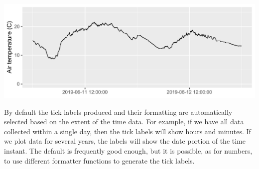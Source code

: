 \documentclass[krantz2]{krantz}\usepackage{knitr}
\begin{document}
\begin{knitrout}\footnotesize
{}\color{fgcolor}\begin{kframe}
\begin{alltt}
\hlstd{(} 
       \hlstd{(}  \hlstd{=}  \hlopt{+}
  \hlstd{()} \hlopt{+}
  \hlstd{(} \hlstd{=} \hlstd{,}
                    \hlstd{=} \hlstd{(}\hlstd{,}  \hlstd{=} \hlstd{)} \hlopt{+} \hlstd{(}\hlopt{:}\hlstd{),}
                    \hlstd{=} \hlstd{(}\hlstd{,}  \hlstd{=} \hlstd{)} \hlopt{+} \hlstd{(}\hlstd{(}\hlstd{,} \hlstd{)))} \hlopt{+}
  \hlstd{(} \hlstd{=} \hlstd{)} \hlopt{+}
  \hlstd{(} \hlstd{=} \hlstd{)}
\end{alltt}


{\ttfamily\noindent\color{warningcolor}{\#\# Warning: Removed 7199 row(s) containing missing values (geom\_path).}}\end{kframe}

{\centering \includegraphics[width=.9\textwidth]{figure/pos-scale-datetime-01-1}

}



\end{knitrout}

By default the tick labels produced and their formatting are automatically selected based on the extent of the time data. For example, if we have all data collected within a single day, then the tick labels will show hours and minutes. If we plot data for several years, the labels will show the date portion of the time instant. The default is frequently good enough, but it is possible, as for numbers, to use different formatter functions to generate the tick labels.
\end{document}
